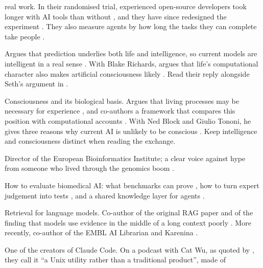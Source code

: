 \begin{description}
    real work. In their randomised trial, experienced open-source developers
    took longer with AI tools than without \parencite{becker2025metr}, and they
    have since redesigned the experiment \parencite{becker2026uplift}. They
    also measure agents by how long the tasks they can complete take people
    \parencite{kwa2025horizon}.
  \item[Blaise Ag\"uera y Arcas (Google)] Argues that prediction underlies both
    life and intelligence, so current models are intelligent in a real sense
    \parencite{aguerayarcas2025intelligence}. With Blake Richards, argues that
    life's computational character also makes artificial consciousness likely
    \parencite{richards2026computational}. Read their reply alongside Seth's
    argument in .
  \item[Anil Seth (University of Sussex)] Consciousness and its biological
    basis. Argues that living processes may be necessary for experience
    \parencite{seth2026naturalism}, and co-authors a framework that compares
    this position with computational accounts
    \parencite{chandaria2026consciousness}. With Ned Block and Giulio Tononi,
    he gives three reasons why current AI is unlikely to be conscious
    \parencite{seth2026threereasons}. Keep intelligence and consciousness
    distinct when reading the exchange.
  \item[Ewan Birney (EMBL-EBI)] Director of the European Bioinformatics
    Institute; a clear voice against hype from someone who lived through the
    genomics boom \parencite{birney2026genomics}.
  \item[Julio Saez-Rodriguez (EMBL-EBI)] How to evaluate biomedical AI: what
    benchmarks can prove \parencite{saezrodriguez2026benchmarking}, how to turn
    expert judgement into tests \parencite{carli2026karenina}, and a shared
    knowledge layer for agents \parencite{sigillo2026embllibrarian}.
  \item[Fabio Petroni (EMBL Rome)] Retrieval for language models. Co-author of
    the original RAG paper \parencite{lewis2020rag} and of the finding that
    models use evidence in the middle of a long context poorly
    \parencite{liu2023lostmiddle}. More recently, co-author of the EMBL AI
    Librarian \parencite{sigillo2026embllibrarian} and Karenina
    \parencite{carli2026karenina}.
  \item[Boris Cherny (Anthropic)] One of the creators of Claude Code. On a
    podcast with Cat Wu, as quoted by \textcite{liu2026claudecode}, they
    call it ``a Unix utility rather than a traditional product'', made of

\end{description}
